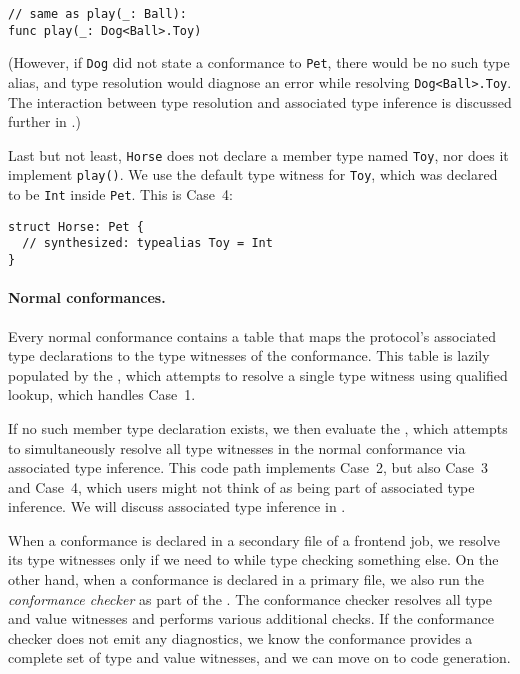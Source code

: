 \documentclass[../generics]{subfiles}
\begin{document}
\begin{example}
\begin{Verbatim}
// same as play(_: Ball):
func play(_: Dog<Ball>.Toy)
\end{Verbatim}
(However, if \texttt{Dog} did not state a conformance to \texttt{Pet}, there would be no such type alias, and type resolution would diagnose an error while resolving \texttt{Dog<Ball>.Toy}. The interaction between type resolution and associated type inference is discussed further in .)

Last but not least, \texttt{Horse} does not declare a member type named \texttt{Toy}, nor does it implement \texttt{play()}. We use the default type witness for \texttt{Toy}, which was declared to be \texttt{Int} inside \texttt{Pet}. This is Case~4:
\begin{Verbatim}
struct Horse: Pet {
  // synthesized: typealias Toy = Int
}
\end{Verbatim}
\end{example}

\paragraph{Normal conformances.}
Every normal conformance contains a table that maps the protocol's associated type declarations to the type witnesses of the conformance. This table is lazily populated by the , which attempts to resolve a single type witness using qualified lookup, which handles Case~1.

If no such member type declaration exists, we then evaluate the , which attempts to simultaneously resolve all type witnesses in the normal conformance via associated type inference. This code path implements Case~2, but also Case~3 and Case~4, which users might not think of as being part of associated type inference. We will discuss associated type inference in .

When a conformance is declared in a secondary file of a frontend job, we resolve its type witnesses only if we need to while type checking something else. On the other hand, when a conformance is declared in a primary file, we also run the \emph{conformance checker} as part of the . The conformance checker resolves all type and value witnesses and performs various additional checks. If the conformance checker does not emit any diagnostics, we know the conformance provides a complete set of type and value witnesses, and we can move on to code generation.
\end{document}
